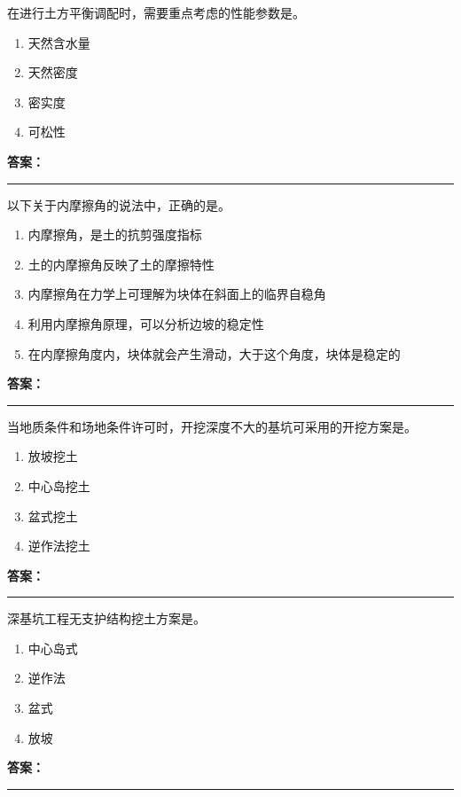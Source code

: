 \documentclass[UTF8,fontset=fandol,11pt]{ctexart}
\newcommand{\answerline}{\textcolor{answerred}{\rule{2.4cm}{0.7pt}}}
\begin{document}
\vspace{0.2em}

\begin{quizbox}[title={第 8 题}]
在进行土方平衡调配时，需要重点考虑的性能参数是。\\
\begin{enumerate}[label=\Alph*.]
\item 天然含水量
\item 天然密度
\item 密实度
\item 可松性
\end{enumerate}
\textbf{\textcolor{answerred}{答案：}} \answerline
\end{quizbox}

\vspace{0.2em}

\begin{quizbox}[title={第 9 题}]
以下关于内摩擦角的说法中，正确的是。\\
\begin{enumerate}[label=\Alph*.]
\item 内摩擦角，是土的抗剪强度指标
\item 土的内摩擦角反映了土的摩擦特性
\item 内摩擦角在力学上可理解为块体在斜面上的临界自稳角
\item 利用内摩擦角原理，可以分析边坡的稳定性
\item 在内摩擦角度内，块体就会产生滑动，大于这个角度，块体是稳定的
\end{enumerate}
\textbf{\textcolor{answerred}{答案：}} \answerline
\end{quizbox}

\vspace{0.2em}

\begin{quizbox}[title={第 10 题}]
当地质条件和场地条件许可时，开挖深度不大的基坑可采用的开挖方案是。\\
\begin{enumerate}[label=\Alph*.]
\item 放坡挖土
\item 中心岛挖土
\item 盆式挖土
\item 逆作法挖土
\end{enumerate}
\textbf{\textcolor{answerred}{答案：}} \answerline
\end{quizbox}

\vspace{0.2em}

\begin{quizbox}[title={第 11 题}]
深基坑工程无支护结构挖土方案是。\\
\begin{enumerate}[label=\Alph*.]
\item 中心岛式
\item 逆作法
\item 盆式
\item 放坡
\end{enumerate}
\textbf{\textcolor{answerred}{答案：}} \answerline
\end{quizbox}
\end{document}

